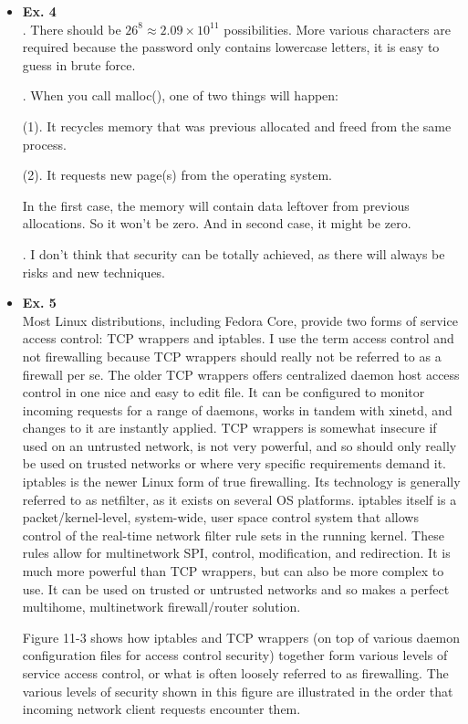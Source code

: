\documentclass{article}
\begin{document}
\begin{itemize}
\item {\bf Ex. 4}\\
{. There should be $26^8\approx 2.09\times 10^11$ possibilities. More various characters are required because the password only contains lowercase letters, it is easy to guess in brute force.\\}

{. When you call malloc(), one of two things will happen:

(1). It recycles memory that was previous allocated and freed from the same process.

(2). It requests new page(s) from the operating system.

In the first case, the memory will contain data leftover from previous allocations. So it won't be zero. And in second case, it might be zero.\\}

{. I don't think that security can be totally achieved, as there will always be risks and new techniques.}

\item {\bf Ex. 5}\\

Most Linux distributions, including Fedora Core, provide two forms of service access control: TCP wrappers and iptables. I use the term access control and not firewalling because TCP wrappers should really not be referred to as a firewall per se. The older TCP wrappers offers centralized daemon host access control in one nice and easy to edit file. It can be configured to monitor incoming requests for a range of daemons, works in tandem with xinetd, and changes to it are instantly applied. TCP wrappers is somewhat insecure if used on an untrusted network, is not very powerful, and so should only really be used on trusted networks or where very specific requirements demand it. iptables is the newer Linux form of true firewalling. Its technology is generally referred to as netfilter, as it exists on several OS platforms. iptables itself is a packet/kernel-level, system-wide, user space control system that allows control of the real-time network filter rule sets in the running kernel. These rules allow for multinetwork SPI, control, modification, and redirection. It is much more powerful than TCP wrappers, but can also be more complex to use. It can be used on trusted or untrusted networks and so makes a perfect multihome, multinetwork firewall/router solution.

Figure 11-3 shows how iptables and TCP wrappers (on top of various daemon configuration files for access control security) together form various levels of service access control, or what is often loosely referred to as firewalling. The various levels of security shown in this figure are illustrated in the order that incoming network client requests encounter them.


\end{itemize}
\end{document}
